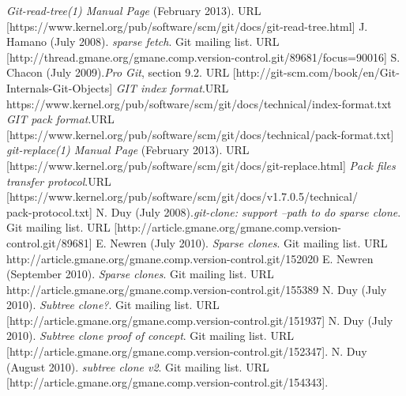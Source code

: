 \documentclass[preprint]{sigplanconf}
\begin{document}
\begin{thebibliography}{10}
    \softraggedright

     \emph{Git-read-tree(1) Manual Page} (February
      2013). \newblock URL
      [https://www.kernel.org/pub/software/scm/git/docs/git-read-tree.html]
     J. Hamano (July 2008). \newblock \emph{sparse fetch}.
    \newblock Git mailing list. \newblock URL
      [http://thread.gmane.org/gmane.comp.version-control.git/89681/focus=90016]
     S. Chacon (July 2009).\newblock\emph{Pro Git}, section 9.2.
      \newblock URL
      [http://git-scm.com/book/en/Git-Internals-Git-Objects]
       \emph{GIT index format}.\newblock URL
      https://www.kernel.org/pub/software/scm/git/docs/technical/index-format.txt
     \emph{GIT pack format}.\newblock URL
      [https://www.kernel.org/pub/software/scm/git/docs/technical/pack-format.txt]
     \emph{git-replace(1) Manual Page} (February 2013).\newblock
      URL [https://www.kernel.org/pub/software/scm/git/docs/git-replace.html]
     \emph{Pack files transfer protocol}.\newblock URL
      [https://www.kernel.org/pub/software/scm/git/docs/v1.7.0.5/technical/\\
      pack-protocol.txt]
    N. Duy (July 2008).\newblock \emph{git-clone: support --path
      to do sparse clone}. \newblock Git mailing list. \newblock URL
      [http://article.gmane.org/gmane.comp.version-control.git/89681]
    E. Newren (July 2010). \newblock \emph{Sparse clones}.
      \newblock Git mailing list. \newblock URL
      http://article.gmane.org/gmane.comp.version-control.git/152020
    E. Newren (September 2010). \newblock \emph{Sparse
      clones}.  \newblock Git mailing list. \newblock URL
      http://article.gmane.org/gmane.comp.version-control.git/155389
    N. Duy (July 2010). \newblock \emph{Subtree clone?}. \newblock
      Git mailing list. \newblock URL
      [http://article.gmane.org/gmane.comp.version-control.git/151937]
    N. Duy (July 2010). \newblock \emph{Subtree clone proof of
    concept}. \newblock Git mailing list. \newblock URL
    [http://article.gmane.org/gmane.comp.version-control.git/152347].
    N. Duy (August 2010). \newblock \emph{subtree clone v2}.
    \newblock Git mailing list. \newblock
    URL [http://article.gmane.org/gmane.comp.version-control.git/154343].
\end{thebibliography}
\end{document}
